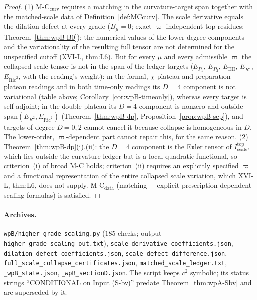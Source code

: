 \documentclass{article}
\theoremstyle{remark}
\begin{document}
\begin{proof}
(1) M-C$_{\mathrm{curv}}$ requires a matching in the curvature-target span together with the matched-scale data of Definition~\ref{def:MCcurv}.
The scale derivative equals the dilation defect at every grade ($B_\mu=0$; exact $\varpi$-independent top residues; Theorem~\ref{thm:wpB-B0}); the numerical values of the lower-degree components and the variationality of the resulting full tensor are not determined for the unspecified cutoff (XVI-L, thm:L6).
But for every $\mu$ and every admissible $\varpi$ the collapsed scale tensor is not in the span of the ledger targets ($E_{P_1}$, $E_{P_2}$, $E_{\mathrm{EH}}$, $E_{R^2}$, $E_{\mathrm{Ric}^2}$, with the reading's weight): in the formal, $\chi$-plateau and preparation-plateau readings and in both time-only readings its $D=4$ component is not variational (table above; Corollary~\ref{cor:wpB-timeonly}), whereas every target is self-adjoint; in the double plateau its $D=4$ component is nonzero and outside $\mathrm{span}(E_{R^2},E_{\mathrm{Ric}^2})$ (Theorem~\ref{thm:wpB-dp}, Proposition~\ref{prop:wpB-sep}), and targets of degree $D=0,2$ cannot cancel it because collapse is homogeneous in $D$.
The lower-order, $\varpi$-dependent part cannot repair this, for the same reason.
(2) Theorem~\ref{thm:wpB-dp}(i),(ii): the $D=4$ component is the Euler tensor of $I^{\mathrm{top}}_{\mathrm{scale}}$, which lies outside the curvature ledger but is a local quadratic functional, so criterion~(i) of broad M-C holds; criterion~(ii) requires an explicitly specified $\varpi$ and a functional representation of the entire collapsed scale variation, which XVI-L, thm:L6, does not supply. M-C$_{\mathrm{data}}$ (matching + explicit prescription-dependent scaling formulas) is satisfied.
\end{proof}

\paragraph{Archives.}
\begin{sloppypar}\noindent
\texttt{wpB/higher\_grade\_scaling.py} ($185$ checks; output \texttt{higher\_grade\_scaling\_out.txt}), \texttt{scale\_derivative\_coefficients.json}, \texttt{dilation\_defect\_coefficients.json}, \texttt{scale\_defect\_difference.json}, \texttt{full\_scale\_collapse\_certificates.json}, \texttt{matched\_scale\_ledger.txt}, \texttt{\_wpB\_state.json}, \texttt{\_wpB\_sectionD.json}.
The script keeps $c^2$ symbolic; its status strings ``CONDITIONAL on Input (S-bv)'' predate Theorem~\ref{thm:wpA-Sbv} and are superseded by it.
\end{sloppypar}
\end{document}
